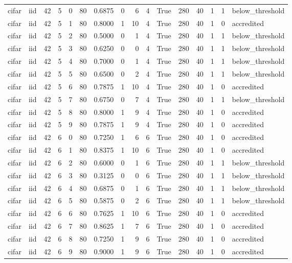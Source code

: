 \begin{tabular}{llrrrrrrrrrrrrrl}
cifar & iid & 42 & 5 & 0 & 80 & 0.6875 & 0 & 6 & 4 & True & 280 & 40 & 1 & 1 & below\_threshold \\
cifar & iid & 42 & 5 & 1 & 80 & 0.8000 & 1 & 10 & 4 & True & 280 & 40 & 1 & 0 & accredited \\
cifar & iid & 42 & 5 & 2 & 80 & 0.5000 & 0 & 1 & 4 & True & 280 & 40 & 1 & 1 & below\_threshold \\
cifar & iid & 42 & 5 & 3 & 80 & 0.6250 & 0 & 0 & 4 & True & 280 & 40 & 1 & 1 & below\_threshold \\
cifar & iid & 42 & 5 & 4 & 80 & 0.7000 & 0 & 1 & 4 & True & 280 & 40 & 1 & 1 & below\_threshold \\
cifar & iid & 42 & 5 & 5 & 80 & 0.6500 & 0 & 2 & 4 & True & 280 & 40 & 1 & 1 & below\_threshold \\
cifar & iid & 42 & 5 & 6 & 80 & 0.7875 & 1 & 10 & 4 & True & 280 & 40 & 1 & 0 & accredited \\
cifar & iid & 42 & 5 & 7 & 80 & 0.6750 & 0 & 7 & 4 & True & 280 & 40 & 1 & 1 & below\_threshold \\
cifar & iid & 42 & 5 & 8 & 80 & 0.8000 & 1 & 9 & 4 & True & 280 & 40 & 1 & 0 & accredited \\
cifar & iid & 42 & 5 & 9 & 80 & 0.7875 & 1 & 9 & 4 & True & 280 & 40 & 1 & 0 & accredited \\
cifar & iid & 42 & 6 & 0 & 80 & 0.7250 & 1 & 6 & 6 & True & 280 & 40 & 1 & 0 & accredited \\
cifar & iid & 42 & 6 & 1 & 80 & 0.8375 & 1 & 10 & 6 & True & 280 & 40 & 1 & 0 & accredited \\
cifar & iid & 42 & 6 & 2 & 80 & 0.6000 & 0 & 1 & 6 & True & 280 & 40 & 1 & 1 & below\_threshold \\
cifar & iid & 42 & 6 & 3 & 80 & 0.3125 & 0 & 0 & 6 & True & 280 & 40 & 1 & 1 & below\_threshold \\
cifar & iid & 42 & 6 & 4 & 80 & 0.6875 & 0 & 1 & 6 & True & 280 & 40 & 1 & 1 & below\_threshold \\
cifar & iid & 42 & 6 & 5 & 80 & 0.5875 & 0 & 2 & 6 & True & 280 & 40 & 1 & 1 & below\_threshold \\
cifar & iid & 42 & 6 & 6 & 80 & 0.7625 & 1 & 10 & 6 & True & 280 & 40 & 1 & 0 & accredited \\
cifar & iid & 42 & 6 & 7 & 80 & 0.8625 & 1 & 7 & 6 & True & 280 & 40 & 1 & 0 & accredited \\
cifar & iid & 42 & 6 & 8 & 80 & 0.7250 & 1 & 9 & 6 & True & 280 & 40 & 1 & 0 & accredited \\
cifar & iid & 42 & 6 & 9 & 80 & 0.9000 & 1 & 9 & 6 & True & 280 & 40 & 1 & 0 & accredited \\

\end{tabular}
